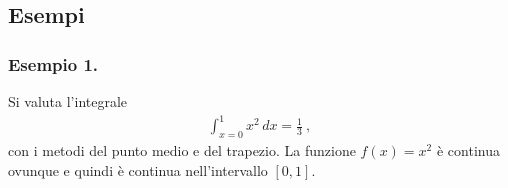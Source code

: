 \documentclass[letterpaper,10pt,italian]{jupyterBook}
\begin{document}
\subsection{Esempi}
\label{\detokenize{ch/numerics/integrals:esempi}}

\subsubsection{Esempio 1.}
\label{\detokenize{ch/numerics/integrals:esempio-1}}
\sphinxAtStartPar
Si valuta l’integrale
\begin{equation*}
\begin{split}\int_{x = 0}^{1} x^2 \, dx = \frac{1}{3} \ ,\end{split}
\end{equation*}
\sphinxAtStartPar
con i metodi del punto medio e del trapezio. La funzione \(f(x) = x^2\) è continua ovunque e quindi è continua nell’intervallo \([0,1]\).
\end{document}
